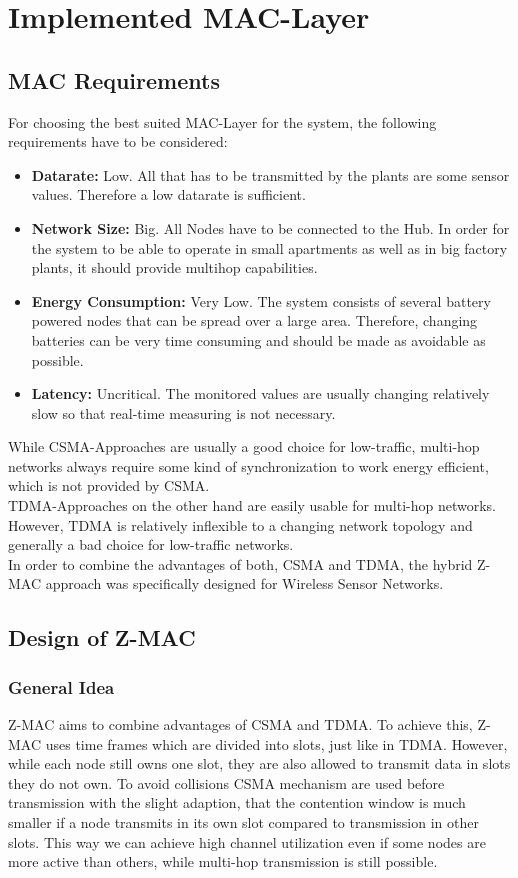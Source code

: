 \section{Implemented MAC-Layer}
\subsection{MAC Requirements}
For choosing the best suited MAC-Layer for the system, the following requirements have to be considered:

\begin{itemize}
	\item \textbf{Datarate:}
	Low. All that has to be transmitted by the plants are some sensor values. Therefore a low datarate is sufficient.
	\item \textbf{Network Size:}
	Big. All Nodes have to be connected to the Hub. In order for the system to be able to operate in small apartments as well as in big factory plants, it should provide multihop capabilities.
	\item \textbf{Energy Consumption:}
	Very Low. The system consists of several battery powered nodes that can be spread over a large area. Therefore, changing batteries can be very time consuming and should be made as avoidable as possible.
	\item \textbf{Latency:}
	Uncritical. The monitored values are usually changing relatively slow so that real-time measuring is not necessary.
\end{itemize}

While CSMA-Approaches are usually a good choice for low-traffic, multi-hop networks always require some kind of synchronization to work energy efficient, which is not provided by CSMA.\\
TDMA-Approaches on the other hand are easily usable for multi-hop networks. However, TDMA is relatively inflexible to a changing network topology and generally a bad choice for low-traffic networks.\\
In order to combine the advantages of both, CSMA and TDMA, the hybrid Z-MAC approach was specifically designed for Wireless Sensor Networks.

\subsection{Design of Z-MAC}
\subsubsection{General Idea}
Z-MAC aims to combine advantages of CSMA and TDMA. To achieve this, Z-MAC uses time frames which are divided into slots, just like in TDMA. However, while each node still owns one slot, they are also allowed to transmit data in slots they do not own. To avoid collisions CSMA mechanism are used before transmission with the slight adaption, that the contention window is much smaller if a node transmits in its own slot compared to transmission in other slots. This way we can achieve high channel utilization even if some nodes are more active than others, while multi-hop transmission is still possible.\cite{rhee2008z}

